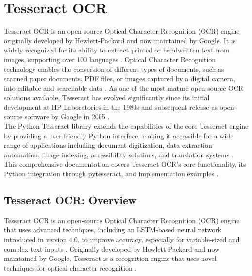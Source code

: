 \chapter{Tesseract OCR}

Tesseract OCR is an open-source Optical Character Recognition (OCR) engine originally developed by Hewlett-Packard and now maintained by Google. It is widely recognized for its ability to extract printed or handwritten text from images, supporting over 100 languages \cite {Betterpath:2023}. Optical Character Recognition technology enables the conversion of different types of documents, such as scanned paper documents, PDF files, or images captured by a digital camera, into editable and searchable data \cite{Anitha:2024}. As one of the most mature open-source OCR solutions available, Tesseract has evolved significantly since its initial development at HP Laboratories in the 1980s and subsequent release as open-source software by Google in 2005 \cite{Betterpath:2023}.\\

The Python Tesseract library extends the capabilities of the core Tesseract engine by providing a user-friendly Python interface, making it accessible for a wide range of applications including document digitization, data extraction automation, image indexing, accessibility solutions, and translation systems \cite{DataCamp:2024}. This comprehensive documentation covers Tesseract OCR's core functionality, its Python integration through pytesseract, and implementation examples \cite {Nutrient:2025}.\\


\section{Tesseract OCR: Overview}

Tesseract OCR is an open-source Optical Character Recognition (OCR) engine that uses advanced techniques, including an LSTM-based neural network introduced in version 4.0, to improve accuracy, especially for variable-sized and complex text inputs \cite {Betterpath:2023, DataCamp:2024}. Originally developed by Hewlett-Packard and now maintained by Google, Tesseract is a recognition engine that uses novel techniques for optical character recognition \cite {Joshi:2021}.\\


